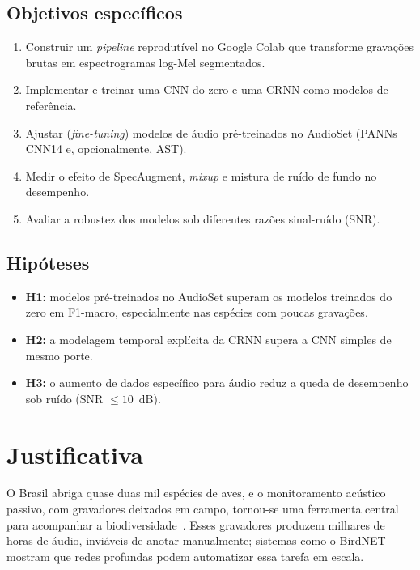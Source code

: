 \documentclass[conference]{IEEEtran}
\begin{document}
\subsection{Objetivos específicos}
\begin{enumerate}
  \item Construir um \textit{pipeline} reprodutível no Google Colab que transforme gravações brutas em espectrogramas log-Mel segmentados.
  \item Implementar e treinar uma CNN do zero e uma CRNN como modelos de referência.
  \item Ajustar (\textit{fine-tuning}) modelos de áudio pré-treinados no AudioSet (PANNs CNN14 e, opcionalmente, AST).
  \item Medir o efeito de SpecAugment, \textit{mixup} e mistura de ruído de fundo no desempenho.
  \item Avaliar a robustez dos modelos sob diferentes razões sinal-ruído (SNR).
\end{enumerate}

\subsection{Hipóteses}
\begin{itemize}
  \item \textbf{H1:} modelos pré-treinados no AudioSet superam os modelos treinados do zero em F1-macro, especialmente nas espécies com poucas gravações.
  \item \textbf{H2:} a modelagem temporal explícita da CRNN supera a CNN simples de mesmo porte.
  \item \textbf{H3:} o aumento de dados específico para áudio reduz a queda de desempenho sob ruído (SNR $\leq 10$~dB).
\end{itemize}

\section{Justificativa}

O Brasil abriga quase duas mil espécies de aves, e o monitoramento acústico passivo, com gravadores deixados em campo, tornou-se uma ferramenta central para acompanhar a biodiversidade~\cite{stowell2022}. Esses gravadores produzem milhares de horas de áudio, inviáveis de anotar manualmente; sistemas como o BirdNET~\cite{kahl2021birdnet} mostram que redes profundas podem automatizar essa tarefa em escala.
\end{document}
